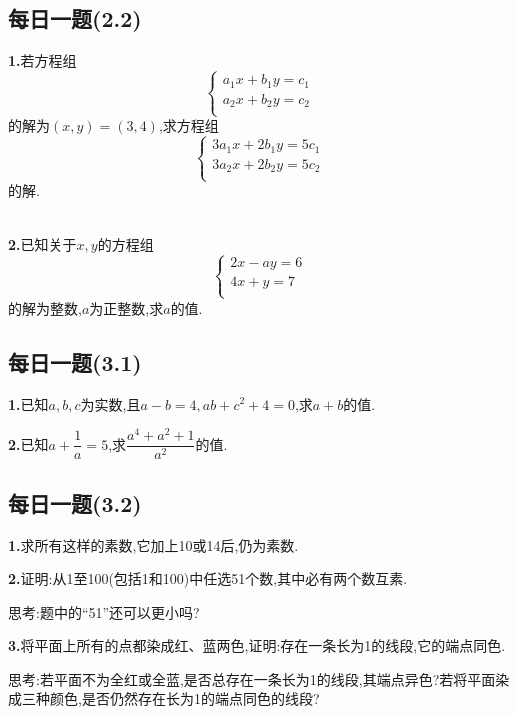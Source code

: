 \documentclass{article}
\begin{document}
{\centering\subsection*{每日一题(2.2)}}
\par\textbf{1.}若方程组
\[\begin{cases}
	a_1x+b_1y=c_1\\a_2x+b_2y=c_2\\
\end{cases}\]
的解为$(x,y)=(3,4)$,求方程组
\[\begin{cases}
	3a_1x+2b_1y=5c_1\\3a_2x+2b_2y=5c_2\\
\end{cases}\]
的解.\\\quad\\
\par\textbf{2.}已知关于$x,y$的方程组
\[\begin{cases}
	2x-ay=6\\4x+y=7\\
\end{cases}\]
的解为整数,$a$为正整数,求$a$的值.\\

{\centering\subsection*{每日一题(3.1)}}
\par\textbf{1.}已知$a,b,c$为实数,且$a-b=4,ab+c^2+4=0$,求$a+b$的值.\\
\par\textbf{2.}已知$a+\dfrac{1}{a}=5$,求$\dfrac{a^4+a^2+1}{a^2}$的值.\\

{\centering\subsection*{每日一题(3.2)}}
\par\textbf{1.}求所有这样的素数,它加上10或14后,仍为素数.\\
\par\textbf{2.}证明:从1至100(包括1和100)中任选51个数,其中必有两个数互素.
\par 思考:题中的“51”还可以更小吗?\\
\par\textbf{3.}将平面上所有的点都染成红、蓝两色,证明:存在一条长为1的线段,它的端点同色.
\par 思考:若平面不为全红或全蓝,是否总存在一条长为1的线段,其端点异色?若将平面染成三种颜色,是否仍然存在长为1的端点同色的线段?\\
\end{document}
